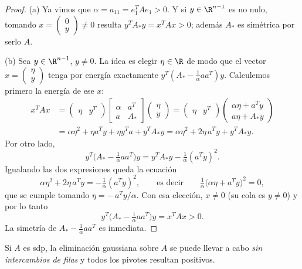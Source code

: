 \begin{proof}
(a) Ya vimos que $\alpha=a_{11}=e_1^TAe_1>0$. Y si $y\in\R^{n-1}$ es no nulo,
tomando $x=\begin{pmatrix}0\\ y\end{pmatrix}\neq0$ resulta
$y^TA_*y = x^TAx>0$; además $A_*$ es simétrica por serlo $A$.

(b) Sea $y\in\R^{n-1}$, $y\neq0$. La idea es elegir $\eta\in\R$ de modo que el
vector $x=\begin{pmatrix}\eta\\ y\end{pmatrix}$ tenga por energía exactamente
$y^T(A_*-\frac1\alpha aa^T)y$. Calculemos primero la energía de ese $x$:
\begin{align*}
x^T A x &= \begin{pmatrix}\eta & y^T \end{pmatrix}
\begin{bmatrix} \alpha & a^T \\ a & A_*\end{bmatrix}
\begin{pmatrix}\eta \\ y \end{pmatrix}
= \begin{pmatrix}\eta & y^T \end{pmatrix}
\begin{pmatrix} \alpha\eta+a^Ty \\ a\eta + A_*y\end{pmatrix}
\\
&= \alpha \eta^2 + \eta a^T y + \eta y^T a + y^T A_* y
= \alpha \eta^2 +2 \eta\, a^T y  + y^T A_* y.
\end{align*}
Por otro lado,
\[
y^T\Big(A_* - \tfrac1\alpha aa^T\Big) y
= y^T A_* y - \tfrac1\alpha (a^T y)^2 .
\]
Igualando las dos expresiones queda la ecuación
\[
\alpha \eta^2 + 2\eta\, a^Ty = -\tfrac1\alpha (a^Ty)^2,
\qquad\text{es decir}\qquad
\tfrac1\alpha\big(\alpha\eta + a^Ty\big)^2 = 0 ,
\]
que se cumple tomando $\eta = -\,a^Ty/\alpha$. Con esa elección,
$x\neq0$ (su cola es $y\neq0$) y por lo tanto
\[
y^T\Big(A_* - \tfrac1\alpha aa^T\Big) y = x^TAx > 0 .
\]
La simetría de $A_*-\frac1\alpha aa^T$ es inmediata.
\end{proof}

\begin{corollary}\label{coro:pivotes-positivos}
Si $A$ es sdp, la eliminación gaussiana sobre $A$ se puede llevar a cabo
\emph{sin intercambios de filas} y todos los pivotes resultan positivos.
\end{corollary}

